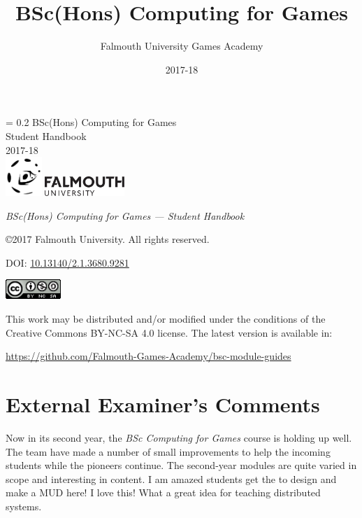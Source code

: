 \documentclass[10pt, a5paper, twoside, openright, titlepage]{memoir}\usepackage{etoolbox}\newtoggle{printable}\toggletrue{printable}\newtoggle{isBeamer}\togglefalse{isBeamer}
\author{Falmouth University Games Academy}
\title{BSc(Hons) Computing for Games}
\date{2017-18}
\newcommand*{\FSfont}[1]{\fontencoding{T1}\fontfamily{#1}\selectfont}
\newcommand*{\titleRF}{
\begingroup%
\drop = 0.2\textheight
\centering
{\vspace{1cm}
\huge BSc(Hons) Computing for Games}\\[\baselineskip]
{\Huge Student Handbook}\\[\baselineskip]
{\large 2017-18}\\[0.5\drop]
\vfill
{\includegraphics[height=4em]{GamesLogoAt}	
\includegraphics[height=2em]{FalmouthLogo}}\\[0.5\baselineskip]
\endgroup}
\newlength{\drop}%
\begin{document}
\thispagestyle{empty}
\titleRF
\pagebreak

\thispagestyle{empty}
\null\vfill

\begin{small}
\begin{flushleft}
\textit{BSc(Hons) Computing for Games --- Student Handbook}

\copyright  2017 Falmouth University. All rights reserved.

\bigskip

DOI: \url{10.13140/2.1.3680.9281}

\vspace{3em}

\includegraphics[height=2em]{ccbyncnd4-88x31}	

\footnotesize This work may be distributed and/or modified under the conditions of the Creative Commons BY-NC-SA 4.0 license. The latest version is available in:

\smallskip

\url{https://github.com/Falmouth-Games-Academy/bsc-module-guides}

\end{flushleft}
\end{small}



\frontmatter

\begin{small}
	\tableofcontents
\end{small}

\newpage

\section*{External Examiner's Comments}

Now in its second year, the \textit{BSc Computing for Games} course is holding up well. The team have made a number of small improvements to help the incoming students while the pioneers continue. The second-year modules are quite varied in scope and interesting in content. I am amazed students get the to design and make a MUD here! I love this! What a great idea for teaching distributed systems.\\
\end{document}
